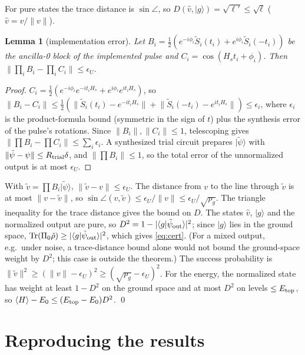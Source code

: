 \documentclass[aps,pra,twocolumn,superscriptaddress,nofootinbib]{revtex4-2}
\newtheorem{lemma}{Lemma}
\newcommand{\ket}[1]{|#1\rangle}
\newcommand{\norm}[1]{\lVert#1\rVert}
\begin{document}
For pure states the trace distance is $\sin\angle$, so $D(\hat v,\ket g)=\sqrt{\ell'}\le\sqrt\ell$
($\hat v=v/\norm v$).

\begin{lemma}[implementation error]
Let $B_i=\frac12(e^{-i\phi_i}\tilde S_i(t_i)+e^{i\phi_i}\tilde S_i(-t_i))$ be the ancilla-0 block of the
implemented pulse and $C_i=\cos(H_st_i+\phi_i)$. Then
$\norm{\prod_iB_i-\prod_iC_i}\le\epsilon_U$.
\end{lemma}
\begin{proof}
$C_i=\frac12(e^{-i\phi_i}e^{-it_iH_s}+e^{i\phi_i}e^{it_iH_s})$, so
$\norm{B_i-C_i}\le\frac12(\norm{\tilde S_i(t_i)-e^{-it_iH_s}}+\norm{\tilde S_i(-t_i)-e^{it_iH_s}})\le\epsilon_i$,
where $\epsilon_i$ is the product-formula bound (symmetric in the sign of $t$) plus the synthesis error
of the pulse's rotations. Since $\norm{B_i},\norm{C_i}\le1$, telescoping gives
$\norm{\prod B_i-\prod C_i}\le\sum_i\epsilon_i$. A synthesized trial circuit prepares $\ket{\tilde\psi}$
with $\norm{\tilde\psi-\psi}\le R_{\rm trial}\delta$, and $\norm{\prod B_i}\le1$, so the total error of the
unnormalized output is at most $\epsilon_U$.
\end{proof}

With $\tilde v=\prod B_i\ket{\tilde\psi}$, $\norm{\tilde v-v}\le\epsilon_U$. The distance from $v$ to the line
through $\tilde v$ is at most $\norm{v-\tilde v}$, so $\sin\angle(v,\tilde v)\le\epsilon_U/\norm v\le
\epsilon_U/\sqrt{p_g}$. The triangle inequality for the trace distance gives the bound on $D$. The
states $\hat v$, $\ket g$ and the normalized output are pure, so $D^2=1-|\langle g|\tilde\psi_{\rm out}\rangle|^2$;
since $\ket g$ lies in the ground space, $\operatorname{Tr}(\Pi_0\tilde\rho)\ge|\langle g|\tilde\psi_{\rm out}\rangle|^2$,
which gives \eqref{eq:cert}. (For a mixed output, e.g.\ under noise, a trace-distance bound alone would
not bound the ground-space weight by $D^2$; this case is outside the theorem.) The
success probability is $\norm{\tilde v}^2\ge(\norm v-\epsilon_U)^2\ge(\sqrt{p_g}-\epsilon_U)^2$. For
the energy, the normalized state has weight at least $1-D^2$ on the ground space and at most $D^2$ on
levels $\le E_{\rm top}$, so $\langle H\rangle-E_0\le(E_{\rm top}-E_0)D^2$. \qed

\section{Reproducing the results}
\label{app:repro}
\end{document}
